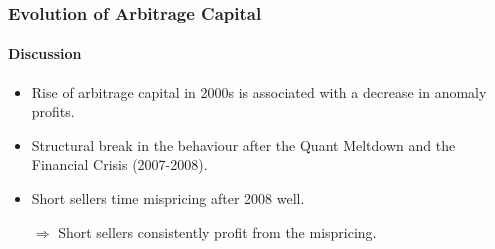 \documentclass{beamer}
\begin{document}
\begin{frame}

\frametitle{Evolution of Arbitrage Capital}
\framesubtitle{Discussion}
\begin{itemize}
\item Rise of arbitrage capital in 2000s is associated with a decrease in anomaly profits.
\item Structural break in the behaviour after the Quant Meltdown and the Financial Crisis (2007-2008).
\item Short sellers time mispricing after 2008 well.
\item[$\Rightarrow$] Short sellers consistently profit from the mispricing.  

\end{itemize}
\end{frame}
%
%
%

\end{document}
